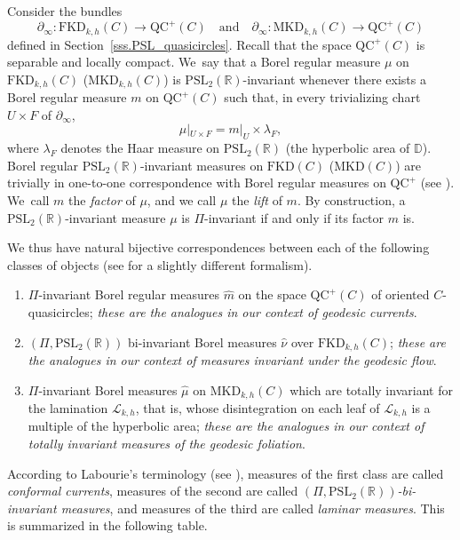 \documentclass[10pt]{amsart}
\theoremstyle{plain}
\theoremstyle{definition}
\newcommand\PSL{\mathrm{PSL}_2(\mathbb{R})}
\newcommand{\D}{{\mathbb D}}
\newcommand{\cL}{{\mathcal L}}
\newcommand{\QC}{\mathrm{QC}}
\newcommand{\MKD}{\mathrm{MKD}}
\newcommand{\FKD}{\mathrm{FKD}}
\newcommand{\bord}{\partial_{\infty}}
\begin{document}
Consider the bundles
\[
\bord:\FKD_{k,h}(C)\to\QC^+(C)\quad\text{and}\quad \bord:\MKD_{k,h}(C)\to\QC^+(C)
\]
defined in Section~\ref{sss.PSL_quasicircles}. Recall that the space $\QC^+(C)$ is separable and locally compact. We~say that a Borel regular measure $\mu$ on $\FKD_{k,h}(C)$ (\resp $\MKD_{k,h}(C)$) is $\PSL$-invariant whenever there exists a Borel regular measure $m$ on $\QC^+(C)$ such that, in every trivializing chart $U\times F$ of $\bord$,
\begin{equation*}
\mu|_{U\times F}=m|_U\times\lambda_F,
\end{equation*}
where $\lambda_F$ denotes the Haar measure on $\PSL$ (\resp the hyperbolic area of $\D$). Borel regular $\PSL$-invariant measures on $\FKD(C)$ (\resp $\MKD(C)$) are trivially in one-to-one correspondence with Borel regular measures on $\QC^+$ (see \cite[Lem.\,4.2.1]{ALS}). We~call $m$ the \emph{factor} of $\mu$, and we call $\mu$ the \emph{lift} of $m$. By construction, a $\PSL$-invariant measure $\mu$ is $\Pi$-invariant if and only if its factor $m$ is.

We thus have natural bijective correspondences between each of the following classes of objects (see \cite[\S 4.2]{ALS} for a slightly different formalism).
\begin{enumerate}
\item $\Pi$-invariant Borel regular measures $\hat m$ on the space $\QC^+(C)$ of oriented $C$\nobreakdash-quasicircles; \emph{these are the analogues in our context of geodesic currents}.
\item $(\Pi,\PSL)$ bi-invariant Borel measures $\hat\nu$ over $\FKD_{k,h}(C)$; \emph{these are the analogues in our context of measures invariant under the geodesic flow}.
\item $\Pi$-invariant Borel measures $\hat\mu$ on $\MKD_{k,h}(C)$ which are totally invariant for the lamination $\cL_{k,h}$, that is, whose disintegration on each leaf of $\cL_{k,h}$ is a multiple of the hyperbolic area; \emph{these are the analogues in our context of totally invariant measures of the geodesic foliation}.
\end{enumerate}

According to Labourie's terminology (see \cite{LabourieBourbaki,MN_currents}), measures of the first class are called \emph{conformal currents}, measures of the second are called \emph{$(\Pi,\PSL)$-bi-invariant measures}, and measures of the third are called \emph{laminar measures}. This is summarized in the following table.
\end{document}
